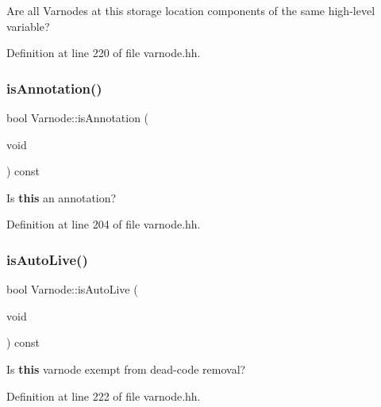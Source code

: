 Are all Varnodes at this storage location components of the same high-\/level variable? 



Definition at line 220 of file varnode.\+hh.

\mbox{\label{class_varnode_a8d1861b1e7c73802273da44c12a59b10}} 
\subsubsection{\texorpdfstring{isAnnotation()}{isAnnotation()}}
{\footnotesize\ttfamily bool Varnode\+::is\+Annotation (\begin{DoxyParamCaption}\item[{void}]{ }\end{DoxyParamCaption}) const\hspace{0.3cm}{\ttfamily [inline]}}



Is {\bfseries{this}} an annotation? 



Definition at line 204 of file varnode.\+hh.

\mbox{\label{class_varnode_aac7f04e1ba903cec5b68da2427165386}} 
\subsubsection{\texorpdfstring{isAutoLive()}{isAutoLive()}}
{\footnotesize\ttfamily bool Varnode\+::is\+Auto\+Live (\begin{DoxyParamCaption}\item[{void}]{ }\end{DoxyParamCaption}) const\hspace{0.3cm}{\ttfamily [inline]}}



Is {\bfseries{this}} varnode exempt from dead-\/code removal? 



Definition at line 222 of file varnode.\+hh.

\mbox{\label{class_varnode_a11850c09d941e033fc0203673335a861}} 
